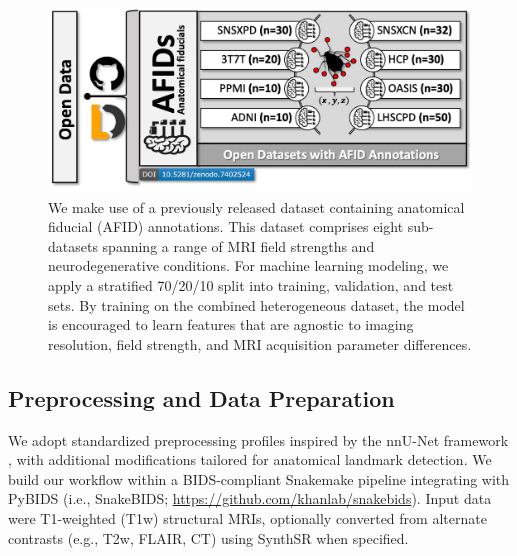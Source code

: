 \begin{figure}[hbt!]
    \centering
    \includegraphics[width=1\linewidth]{figs/ch3_Figure_data.png}
    \caption{We make use of a previously released dataset containing anatomical fiducial (AFID) annotations. This dataset comprises eight sub-datasets spanning a range of MRI field strengths and neurodegenerative conditions. For machine learning modeling, we apply a stratified 70/20/10 split into training, validation, and test sets. By training on the combined heterogeneous dataset, the model is encouraged to learn features that are agnostic to imaging resolution, field strength, and MRI acquisition parameter differences.}
    \label{fig:ch3_Figure_data}
\end{figure}

\subsection{Preprocessing and Data Preparation}

We adopt standardized preprocessing profiles inspired by the nnU-Net framework \cite{Isensee2021-ev}, with additional modifications tailored for anatomical landmark detection. We build our workflow within a BIDS-compliant Snakemake \cite{Koster2012-ok} pipeline integrating with PyBIDS \cite{Yarkoni2019-lu} (i.e., SnakeBIDS; \url{https://github.com/khanlab/snakebids}). Input data were T1-weighted (T1w) structural MRIs, optionally converted from alternate contrasts (e.g., T2w, FLAIR, CT) using SynthSR \cite{Iglesias2023-co} when specified. 

